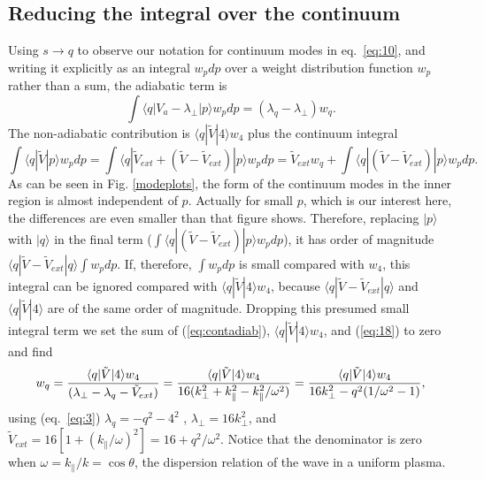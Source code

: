 \documentclass[12pt]{article}
\def\ket#1{|#1\rangle}
\def\bra#1{\langle#1}
\begin{document}
\subsection{Reducing the integral over the continuum}
\label{reducing}
Using $s\to q$ to observe our notation for continuum modes in eq.\
\ref{eq:10}, and writing it explicitly as an integral $w_pdp$ over a
weight distribution function $w_p$ rather than a
sum, the adiabatic term is
\begin{equation}
  \label{eq:contadiab}
  \int\bra{q}|V_a-\lambda_\perp\ket{p}w_pdp = (\lambda_q-\lambda_\perp)w_q.
\end{equation}
The non-adiabatic contribution is $\bra{q}|\tilde{V}\ket{4}w_4$ plus the
continuum integral
\begin{equation}
  \label{eq:18}
  \int \bra{q}|\tilde{V}\ket{p}w_pdp=\int\bra{q}|\tilde{V}_{ext}+(\tilde{V}-\tilde{V}_{ext})\ket{p}w_pdp
  =\tilde{V}_{ext}w_q +\int\bra{q}|(\tilde{V}-\tilde{V}_{ext})\ket{p}w_pdp.
\end{equation}
As can be seen in Fig. \ref{modeplots}, the form of the continuum
modes in the inner region is almost independent of $p$. Actually for
small $p$, which is our interest here, the differences are even
smaller than that figure shows. Therefore, replacing $\ket{p}$ with
$\ket{q}$ in the final term ($\int\bra{q}|(\tilde{V}-\tilde{V}_{ext})\ket{p}w_pdp $), it has order of
magnitude $\bra{q}|\tilde{V}-\tilde{V}_{ext}\ket{q}\int w_pdp$. If,
therefore, $\int w_pdp$ is small compared with $w_4$, this integral
can be ignored compared with $\bra{q}|\tilde{V}\ket{4}w_4$, because
$\bra{q}|\tilde{V}-\tilde{V}_{ext}\ket{q}$ and
$\bra{q}|\tilde{V}\ket{4}$ are of the same order of
magnitude. Dropping this presumed small integral term we set the sum
of (\ref{eq:contadiab}), $\bra{q}|\tilde{V}\ket{4}w_4$, and
(\ref{eq:18}) to zero and find
\begin{equation}
  \label{eq:resonance}
  w_q = {\bra{q}|\tilde{V}\ket{4}w_4\over (\lambda_\perp-\lambda_q-\tilde{V}_{ext})}
  ={\bra{q}|\tilde{V}\ket{4}w_4\over
    16(k_\perp^2+k_\parallel^2-k_\parallel^2/\omega^2) }
  ={\bra{q}|\tilde{V}\ket{4}w_4\over 16k_\perp^2-q^2(1/\omega^2-1) },
\end{equation}
using (eq.\ \ref{eq:3}) $\lambda_q=-q^2-4^2$ , $\lambda_\perp=16k_\perp^2$, and
$\tilde{V}_{ext}=16[1+(k_\parallel/\omega)^2]=16+q^2/\omega^2$. Notice that the
denominator is zero when $\omega=k_\parallel/k=\cos\theta$, the
dispersion relation of the wave in a uniform plasma. 
\end{document}
